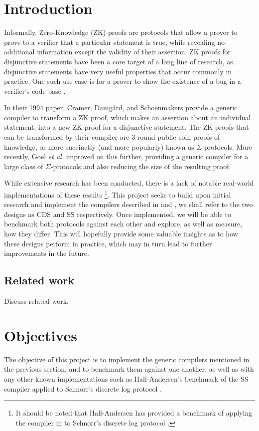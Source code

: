 \section{Introduction}

Informally, Zero-Knowledge (ZK) proofs are protocols that allow a prover to prove to a verifier that a particular statement is true, while revealing no additional information except the validity of their assertion. ZK proofs for disjunctive statements have been a core target of a long line of research, as disjunctive statements have very useful properties that occur commonly in practice. One such use case is for a prover to show the existence of a bug in a verifier's code base \cite{StackedGF}.

In their 1994 paper, Cramer, Damg{\aa}rd, and Schoenmakers \cite{CDS94} provide a generic compiler to transform a ZK proof, which makes an assertion about an individual statement, into a new ZK proof for a disjunctive statement. The ZK proofs that can be transformed by their compiler are 3-round public coin proofs of knowledge, or more succinctly (and more popularly) known as $\Sigma$-protocols. %
More recently, Goel {\em et al.} \cite{StackingSigmas} improved on this further, providing a generic compiler for a large class of $\Sigma$-protocols and also reducing the size of the resulting proof. 

While extensive research has been conducted, there is a lack of notable real-world implementations of these results
\footnote{It should be noted that Hall-Andersen \cite{MHAStackSig} has provided a benchmark of applying the compiler in \cite{StackingSigmas} to Schnorr's discrete log protocol \cite{Schnorr}.}. 
This project seeks to build upon initial research and implement the compilers described in \cite{CDS94} and \cite{StackingSigmas}, we shall refer to the two designs as CDS and SS respectively. Once implemented, we will be able to benchmark both protocols against each other and explore, as well as measure, how they differ. This will hopefully provide some valuable insights as to how these designs perform in practice, which may in turn lead to further improvements in the future.

\subsection{Related work}

Discuss related work.

\section{Objectives}
The objective of this project is to implement the generic compilers mentioned in the previous section, and to benchmark them against one another, as well as with any other known implementations such as Hall-Andersen's benchmark of the SS compiler \cite{StackingSigmas} applied to Schnorr's discrete log protocol \cite{Schnorr}. 


